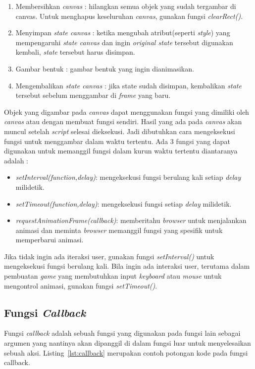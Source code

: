 \begin{enumerate}
	\item Membersihkan \textit{canvas} : hilangkan semua objek yang sudah tergambar di canvas. Untuk menghapus keseluruhan \textit{canvas}, gunakan fungsi \textit{clearRect()}.
	\item Menyimpan \textit{state canvas} : ketika mengubah atribut(seperti \textit{style}) yang mempengaruhi \textit{state canvas} dan ingin \textit{original state} tersebut digunakan kembali, \textit{state} tersebut harus disimpan. 
	\item Gambar bentuk : gambar bentuk yang ingin dianimasikan.
	\item Mengembalikan \textit{state canvas} : jika state sudah disimpan, kembalikan \textit{state} tersebut sebelum menggambar di \textit{frame} yang baru.
\end{enumerate}

Objek yang digambar pada \textit{canvas} dapat menggunakan fungsi yang dimiliki oleh \textit{canvas} atau dengan membuat fungsi sendiri. Hasil yang ada pada \textit{canvas} akan muncul setelah \textit{script} selesai dieksekusi. Jadi dibutuhkan cara mengeksekusi fungsi untuk menggambar dalam waktu tertentu. Ada 3 fungsi yang dapat digunakan untuk memanggil fungsi dalam kurun waktu tertentu diantaranya adalah :

\begin{itemize}
	\item \textit{setInterval(function,delay)}: mengeksekusi fungsi berulang kali setiap \textit{delay} milidetik.
	\item \textit{setTimeout(function,delay)}: mengeksekusi fungsi setiap \textit{delay} milidetik.
	\item \textit{requestAnimationFrame(callback)}: memberitahu \textit{browser} untuk menjalankan animasi dan meminta \textit{browser} memanggil fungsi yang spesifik untuk memperbarui animasi.
\end{itemize}

Jika tidak ingin ada iteraksi user, gunakan fungsi \textit{setInterval()} untuk mengeksekusi fungsi berulang kali. Bila ingin ada interaksi user, terutama dalam pembuatan \textit{game} yang membutuhkan input \textit{keyboard} atau \textit{mouse} untuk mengontrol animasi, gunakan fungsi \textit{setTimeout()}.

\subsection{Fungsi \textit{Callback}}
Fungsi \textit{callback} adalah sebuah fungsi yang digunakan pada fungsi lain sebagai argumen yang nantinya akan dipanggil di dalam fungsi luar untuk menyelesaikan sebuah aksi. Listing~\ref{lst:callback} merupakan contoh potongan kode pada fungsi callback.

